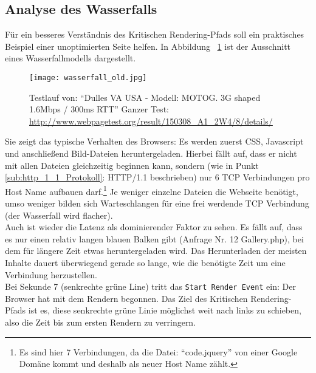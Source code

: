 
	\pagebreak

	\subsection{Analyse des Wasserfalls}
	\label{sub:analyse_des_wasserfalls}
		Für ein besseres Verständnis des Kritischen Rendering-Pfads soll ein praktisches Beispiel einer unoptimierten Seite helfen. In Abbildung ~\ref{fig:wasserfall_old} ist der Ausschnitt eines Wasserfallmodells dargestellt. 

		\begin{figure}[htbp]
			\begin{center}
				\texttt{[image: wasserfall\_old.jpg]}
				\caption{Testlauf von: "`Dulles VA USA - Modell: MOTOG. 3G shaped 1.6Mbps / 300ms RTT"' Ganzer Test: \url{http://www.webpagetest.org/result/150308_A1_2W4/8/details/}}
				\label{fig:wasserfall_old}
			\end{center}
		\end{figure}
		
	  Sie zeigt das typische Verhalten des Browsers: Es werden zuerst CSS, Javascript und anschließend Bild-Dateien heruntergeladen. Hierbei fällt auf, dass er nicht mit allen Dateien gleichzeitig beginnen kann, sondern (wie in Punkt \ref{sub:http_1_1_Protokoll}: HTTP/1.1 beschrieben) nur 6 TCP Verbindungen pro Host Name aufbauen darf.\footnote{Es sind hier 7 Verbindungen, da die Datei: "`code.jquery"' von einer Google Domäne kommt und deshalb als neuer Host Name zählt.} Je weniger einzelne Dateien die Webseite benötigt, umso weniger bilden sich Warteschlangen für eine frei werdende TCP Verbindung (der Wasserfall wird flacher).\\
	  Auch ist wieder die Latenz als dominierender Faktor zu sehen. Es fällt auf, dass es nur einen relativ langen blauen Balken gibt (Anfrage Nr. 12 Gallery.php), bei dem für längere Zeit etwas heruntergeladen wird. Das Herunterladen der meisten Inhalte dauert überwiegend gerade so lange, wie die benötigte Zeit um eine Verbindung herzustellen.\\
	  Bei Sekunde 7 (senkrechte grüne Line) tritt das \texttt{Start Render Event} ein: Der Browser hat mit dem Rendern begonnen. Das Ziel des Kritischen Rendering-Pfads ist es, diese senkrechte grüne Linie möglichst weit nach links zu schieben, also die Zeit bis zum ersten Rendern zu verringern.\\

